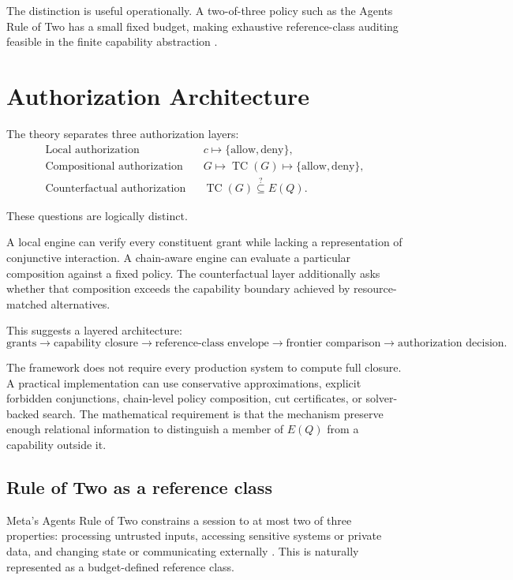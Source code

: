 \documentclass[11pt]{article}
\newcommand{\TC}{\operatorname{TC}}
\begin{document}
The distinction is useful operationally. A two-of-three policy such as the Agents Rule of Two has a small fixed budget, making exhaustive reference-class auditing feasible in the finite capability abstraction \cite{meta2025}.

\section{Authorization Architecture}

The theory separates three authorization layers:
\[
\begin{array}{rcl}
\text{Local authorization} && c\mapsto\{\mathrm{allow},\mathrm{deny}\},\\
\text{Compositional authorization} && G\mapsto\TC(G)\mapsto\{\mathrm{allow},\mathrm{deny}\},\\
\text{Counterfactual authorization} && \TC(G)\stackrel{?}{\subseteq}E(Q).
\end{array}
\]

These questions are logically distinct.

A local engine can verify every constituent grant while lacking a representation of conjunctive interaction. A chain-aware engine can evaluate a particular composition against a fixed policy. The counterfactual layer additionally asks whether that composition exceeds the capability boundary achieved by resource-matched alternatives.

This suggests a layered architecture:
\[
\boxed{
\text{grants}
\rightarrow
\text{capability closure}
\rightarrow
\text{reference-class envelope}
\rightarrow
\text{frontier comparison}
\rightarrow
\text{authorization decision}.
}
\]

The framework does not require every production system to compute full closure. A practical implementation can use conservative approximations, explicit forbidden conjunctions, chain-level policy composition, cut certificates, or solver-backed search. The mathematical requirement is that the mechanism preserve enough relational information to distinguish a member of $E(Q)$ from a capability outside it.

\subsection{Rule of Two as a reference class}

Meta's Agents Rule of Two constrains a session to at most two of three properties: processing untrusted inputs, accessing sensitive systems or private data, and changing state or communicating externally \cite{meta2025}. This is naturally represented as a budget-defined reference class.
\end{document}
